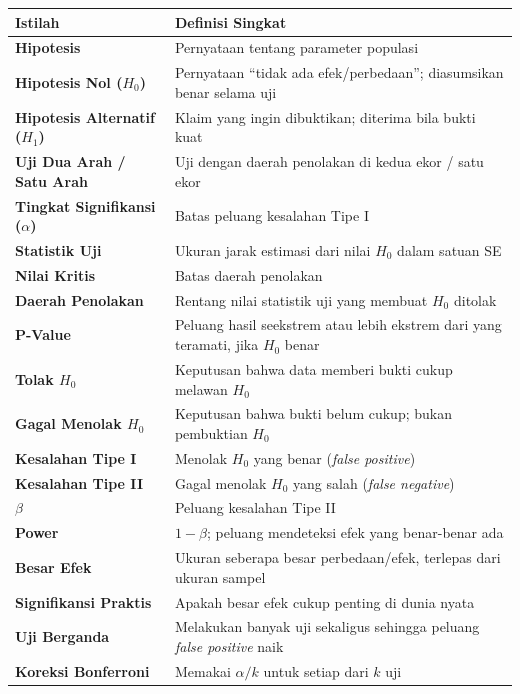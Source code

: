 \documentclass[
  indonesian,
  letterpaper,
]{book}
\newcounter{none} %
\begin{document}
{\def\LTcaptype{none} %
\begin{longtable}[]{@{}
  >{\raggedright\arraybackslash}p{}
  >{\raggedright\arraybackslash}p{}@{}}
\toprule\noalign{}
\begin{minipage}[b]{\linewidth}\raggedright
Istilah
\end{minipage} & \begin{minipage}[b]{\linewidth}\raggedright
Definisi Singkat
\end{minipage} \\
\midrule\noalign{}
\endhead
\bottomrule\noalign{}
\endlastfoot
\textbf{Hipotesis} & Pernyataan tentang parameter populasi \\
\textbf{Hipotesis Nol (\(H_0\))} & Pernyataan ``tidak ada
efek/perbedaan''; diasumsikan benar selama uji \\
\textbf{Hipotesis Alternatif (\(H_1\))} & Klaim yang ingin dibuktikan;
diterima bila bukti kuat \\
\textbf{Uji Dua Arah / Satu Arah} & Uji dengan daerah penolakan di kedua
ekor / satu ekor \\
\textbf{Tingkat Signifikansi (\(\alpha\))} & Batas peluang kesalahan
Tipe I \\
\textbf{Statistik Uji} & Ukuran jarak estimasi dari nilai \(H_0\) dalam
satuan SE \\
\textbf{Nilai Kritis} & Batas daerah penolakan \\
\textbf{Daerah Penolakan} & Rentang nilai statistik uji yang membuat
\(H_0\) ditolak \\
\textbf{P-Value} & Peluang hasil seekstrem atau lebih ekstrem dari yang
teramati, jika \(H_0\) benar \\
\textbf{Tolak \(H_0\)} & Keputusan bahwa data memberi bukti cukup
melawan \(H_0\) \\
\textbf{Gagal Menolak \(H_0\)} & Keputusan bahwa bukti belum cukup;
bukan pembuktian \(H_0\) \\
\textbf{Kesalahan Tipe I} & Menolak \(H_0\) yang benar (\emph{false
positive}) \\
\textbf{Kesalahan Tipe II} & Gagal menolak \(H_0\) yang salah
(\emph{false negative}) \\
\(\beta\) & Peluang kesalahan Tipe II \\
\textbf{Power} & \(1 - \beta\); peluang mendeteksi efek yang benar-benar
ada \\
\textbf{Besar Efek} & Ukuran seberapa besar perbedaan/efek, terlepas
dari ukuran sampel \\
\textbf{Signifikansi Praktis} & Apakah besar efek cukup penting di dunia
nyata \\
\textbf{Uji Berganda} & Melakukan banyak uji sekaligus sehingga peluang
\emph{false positive} naik \\
\textbf{Koreksi Bonferroni} & Memakai \(\alpha/k\) untuk setiap dari
\(k\) uji \\
\end{longtable}
}
\end{document}
